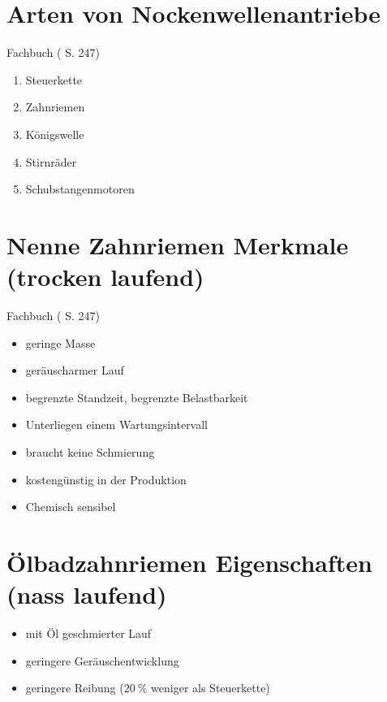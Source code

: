 \section{Arten von
Nockenwellenantriebe}\label{arten-von-nockenwellenantriebe}

Fachbuch (\textcite{brand:2020:fachkundeKfz} S. 247)

\begin{enumerate}
\item
  Steuerkette
\item
  Zahnriemen
\item
  Königswelle
\item
  Stirnräder
\item
  Schubstangenmotoren
\end{enumerate}

\section{Nenne Zahnriemen Merkmale (trocken
laufend)}\label{nenne-zahnriemen-merkmale-trocken-laufend}

Fachbuch (\textcite{brand:2020:fachkundeKfz} S. 247)

\begin{itemize}
\item
  geringe Masse
\item
  geräuscharmer Lauf
\item
  begrenzte Standzeit, begrenzte Belastbarkeit
\item
  Unterliegen einem Wartungsintervall
\item
  braucht keine Schmierung
\item
  kostengünstig in der Produktion
\item
  Chemisch sensibel
\end{itemize}

\section{Ölbadzahnriemen Eigenschaften (nass
laufend)}\label{oelbadzahnriemen-eigenschaften-nass-laufend}

\begin{itemize}
\item
  mit Öl geschmierter Lauf
\item
  geringere Geräuschentwicklung
\item
  geringere Reibung ($20~\%$ weniger als Steuerkette)
\end{itemize}

